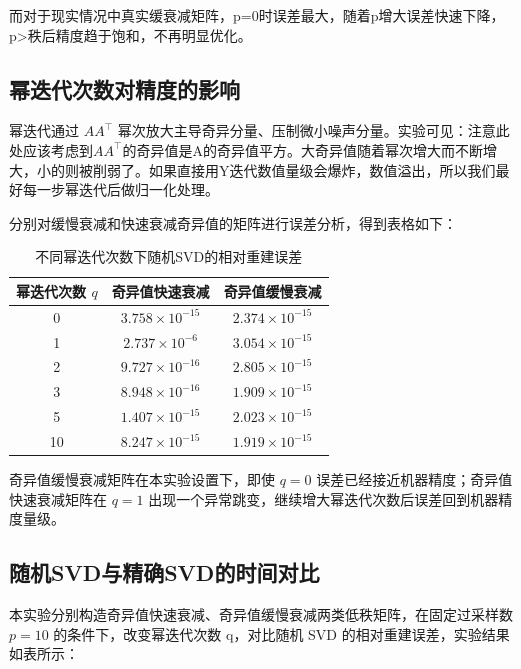 \documentclass{article}
\begin{document}
而对于现实情况中真实缓衰减矩阵，p=0时误差最大，随着p增大误差快速下降，p>秩后精度趋于饱和，不再明显优化。



\subsection{幂迭代次数对精度的影响}

\noindent


幂迭代通过 \(AA^\top\) 幂次放大主导奇异分量、压制微小噪声分量。实验可见：注意此处应该考虑到\(AA^\top\)的奇异值是A的奇异值平方。大奇异值随着幂次增大而不断增大，小的则被削弱了。如果直接用Y迭代数值量级会爆炸，数值溢出，所以我们最好每一步幂迭代后做归一化处理。

分别对缓慢衰减和快速衰减奇异值的矩阵进行误差分析，得到表格如下：

\begin{table}[H]
	\centering
	\caption{不同幂迭代次数下随机SVD的相对重建误差}
	\label{tab:power_iter_err}
	\begin{tabular}{ccc}
		\hline
		幂迭代次数 $q$ & 奇异值快速衰减 & 奇异值缓慢衰减 \\
		\hline
		0  & $3.758\times 10^{-15}$ & $2.374\times 10^{-15}$ \\
		1  & $2.737\times 10^{-6}$  & $3.054\times 10^{-15}$ \\
		2  & $9.727\times 10^{-16}$ & $2.805\times 10^{-15}$ \\
		3  & $8.948\times 10^{-16}$ & $1.909\times 10^{-15}$ \\
		5  & $1.407\times 10^{-15}$ & $2.023\times 10^{-15}$ \\
		10 & $8.247\times 10^{-15}$ & $1.919\times 10^{-15}$ \\
		\hline
	\end{tabular}
\end{table}

奇异值缓慢衰减矩阵在本实验设置下，即使 \(q=0\) 误差已经接近机器精度；奇异值快速衰减矩阵在 \(q=1\) 出现一个异常跳变，继续增大幂迭代次数后误差回到机器精度量级。


\subsection{随机SVD与精确SVD的时间对比}

本实验分别构造奇异值快速衰减、奇异值缓慢衰减两类低秩矩阵，在固定过采样数 \(p=10\) 的条件下，改变幂迭代次数 q，对比随机 SVD 的相对重建误差，实验结果如表所示：
\end{document}
